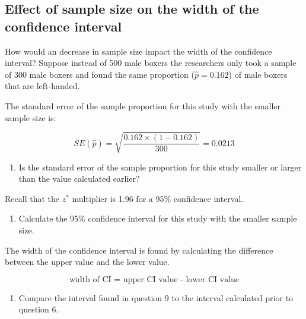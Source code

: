\documentclass[
]{report}
\providecommand{\tightlist}{%
  \setlength{\itemsep}{0pt}\setlength{\parskip}{0pt}}
\begin{document}
\vspace{1in}

\newpage

\subsection*{Effect of sample size on the width of the confidence interval}\label{effect-of-sample-size-on-the-width-of-the-confidence-interval}

How would an decrease in sample size impact the width of the confidence interval? Suppose instead of 500 male boxers the researchers only took a sample of 300 male boxers and found the same proportion (\(\hat{p}=0.162\)) of male boxers that are left-handed.

The standard error of the sample proportion for this study with the smaller sample size is:

\[SE(\hat{p}) = \sqrt{\frac{0.162\times (1-0.162)}{300}} = 0.0213\]

\begin{enumerate}
\def\labelenumi{\arabic{enumi}.}
\setcounter{enumi}{7}
\tightlist
\item
  Is the standard error of the sample proportion for this study smaller or larger than the value calculated earlier?
\end{enumerate}

\vspace{0.3in}

Recall that the \(z^*\) multiplier is 1.96 for a 95\% confidence interval.

\begin{enumerate}
\def\labelenumi{\arabic{enumi}.}
\setcounter{enumi}{8}
\tightlist
\item
  Calculate the 95\% confidence interval for this study with the smaller sample size.
\end{enumerate}

\vspace{1in}

The width of the confidence interval is found by calculating the difference between the upper value and the lower value.

\[\text{width of CI = upper CI value - lower CI value}\]

\begin{enumerate}
\def\labelenumi{\arabic{enumi}.}
\setcounter{enumi}{9}
\tightlist
\item
  Compare the interval found in question 9 to the interval calculated prior to question 6.
\end{enumerate}
\end{document}

